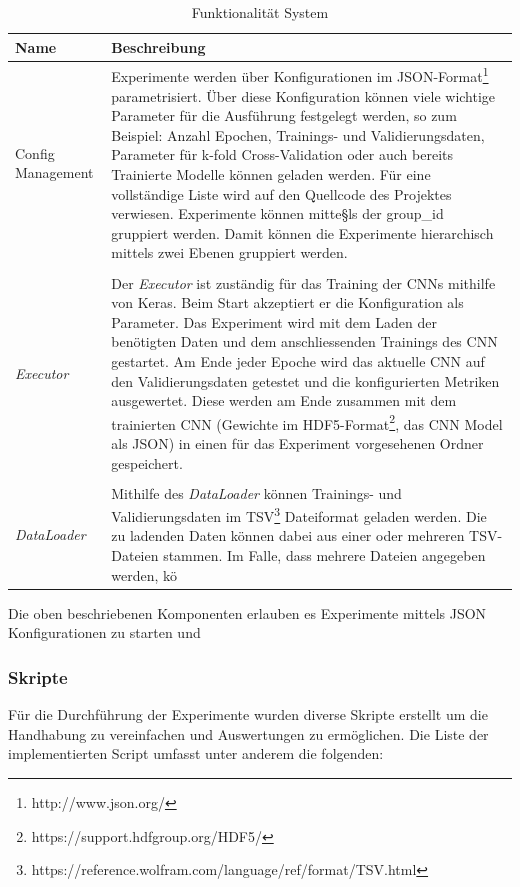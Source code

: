 \begin{table}[h]
	\begin{adjustbox}{max width=\columnwidth}
		\begin{tabular}{|p{4cm}|p{14cm}|}
			\toprule
			Name & Beschreibung\\ \midrule
			Config Management & Experimente werden über Konfigurationen im JSON-Format\footnote{http://www.json.org/} parametrisiert. Über diese Konfiguration können viele wichtige Parameter für die Ausführung festgelegt werden, so zum Beispiel: Anzahl Epochen, Trainings- und Validierungsdaten, Parameter für k-fold Cross-Validation oder auch bereits Trainierte Modelle können geladen werden. Für eine vollständige Liste wird auf den Quellcode des Projektes verwiesen. Experimente können mitte§ls der group{\_}id gruppiert werden. Damit können die Experimente hierarchisch mittels zwei Ebenen gruppiert werden.\\
			&\\
			\emph{Executor} & Der \emph{Executor} ist zuständig für das Training der CNNs mithilfe von Keras. Beim Start akzeptiert er die Konfiguration als Parameter. Das Experiment wird mit dem Laden der benötigten Daten und dem anschliessenden Trainings des CNN gestartet. Am Ende jeder Epoche wird das aktuelle CNN auf den Validierungsdaten getestet und die konfigurierten Metriken ausgewertet. Diese werden am Ende zusammen mit dem trainierten CNN (Gewichte im HDF5-Format\footnote{https://support.hdfgroup.org/HDF5/}, das CNN Model als JSON) in einen für das Experiment vorgesehenen Ordner gespeichert. \\
			&\\
			\emph{DataLoader} & Mithilfe des \emph{DataLoader} können Trainings- und Validierungsdaten im TSV\footnote{https://reference.wolfram.com/language/ref/format/TSV.html} Dateiformat geladen werden. Die zu ladenden Daten können dabei aus einer oder mehreren TSV-Dateien stammen. Im Falle, dass mehrere Dateien angegeben werden, kö\\
			\bottomrule
		\end{tabular}
	\end{adjustbox}
	\caption{Funktionalität System}
\end{table}

Die oben beschriebenen Komponenten erlauben es Experimente mittels JSON Konfigurationen zu starten und 

\subsubsection{Skripte}
Für die Durchführung der Experimente wurden diverse Skripte erstellt um die Handhabung zu vereinfachen und Auswertungen zu ermöglichen. Die Liste der implementierten Script umfasst unter anderem die folgenden:

